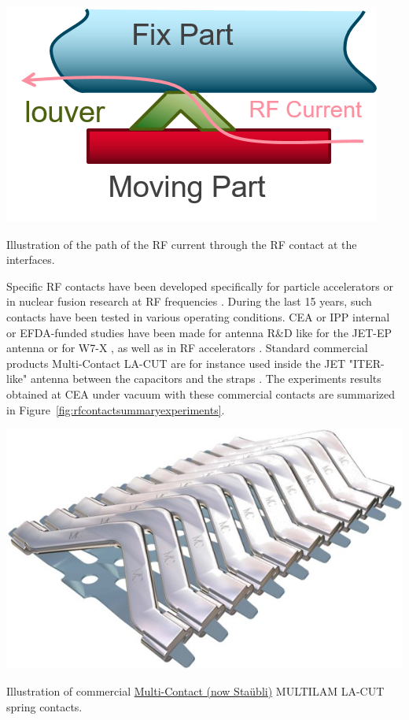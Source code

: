 {\begin{marginfigure}
	\centering
	\includegraphics[width=1.0\linewidth]{figures/chap3/RF_contacts/RF_contact_RFcurrent}
	\caption{Illustration of the path of the RF current through the RF contact at the interfaces.}
	\label{fig:rfcontactrfcurrent}
\end{marginfigure}


Specific RF contacts have been developed specifically for particle accelerators  or in nuclear fusion research at RF frequencies  . During the last 15 years, such contacts have been tested in various operating conditions. CEA or IPP internal or EFDA-funded studies have been made for antenna R\&D like for the JET-EP antenna or for W7-X , as well as in RF accelerators . Standard commercial products Multi-Contact LA-CUT are for instance used inside the JET "ITER-like" antenna between the capacitors and the straps . The experiments results obtained at CEA under vacuum with these commercial contacts are summarized in Figure~\ref{fig:rfcontactsummaryexperiments}.

\begin{marginfigure}
	\centering
	\includegraphics[width=0.9\linewidth]{figures/chap3/RF_contacts/RF_contact_LACUT}
	\caption{Illustration of commercial \href{https://ec.staubli.com/products/productline/7}{Multi-Contact (now Staübli)} MULTILAM  LA-CUT spring contacts. }
	\label{fig:rfcontactlacut}
\end{marginfigure}

}
